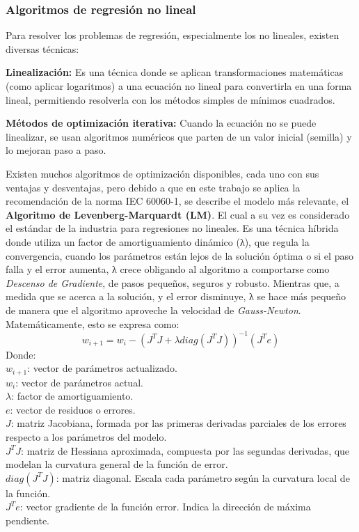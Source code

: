 \subsubsection{Algoritmos de regresión no lineal}
Para resolver los problemas de regresión, especialmente los no lineales, existen diversas técnicas:\par
\textbf{Linealización:} Es una técnica donde se aplican transformaciones matemáticas (como aplicar logaritmos) a una ecuación no lineal para convertirla en una forma lineal, permitiendo resolverla con los métodos simples de mínimos cuadrados.\par
\textbf{Métodos de optimización iterativa:} Cuando la ecuación no se puede linealizar, se usan algoritmos numéricos que parten de un valor inicial (semilla) y lo mejoran paso a paso.\par
Existen muchos algoritmos de optimización disponibles, cada uno con sus ventajas y desventajas, pero debido a que en este trabajo se aplica la recomendación de la norma IEC 60060-1, se describe el modelo más relevante, el \textbf{Algoritmo de Levenberg-Marquardt (LM)}. El cual a su vez es considerado el estándar de la industria para regresiones no lineales. Es una técnica híbrida donde utiliza un factor de amortiguamiento dinámico (λ), que regula la convergencia, cuando los parámetros están lejos de la solución óptima o si el paso falla y el error aumenta, λ crece obligando al algoritmo a comportarse como \textit{Descenso de Gradiente}, de pasos pequeños, seguros y robusto. Mientras que, a medida que se acerca a la solución, y el error disminuye, λ se hace más pequeño de manera que el algoritmo aproveche la velocidad de \textit{Gauss-Newton}. Matemáticamente, esto se expresa como:
\begin{equation}
    w_{i+1} = w_i - \left( J^T J + \lambda diag(J^T J) \right)^{-1} (J^T e)
\end{equation}
Donde:\\
$w_{i+1}$: vector de parámetros actualizado.\\
$w_i$: vector de parámetros actual.\\
$\lambda$: factor de amortiguamiento.\\
$e$: vector de residuos o errores.\\
$J$: matriz Jacobiana, formada por las primeras derivadas parciales de los errores respecto a los parámetros del modelo.\\
$J^T J$: matriz de Hessiana aproximada, compuesta por las segundas derivadas, que modelan la curvatura general de la función de error.\\
$diag(J^T J)$: matriz diagonal. Escala cada parámetro según la curvatura local de la función.\\
$J^T e$: vector gradiente de la función error. Indica la dirección de máxima pendiente.\\

